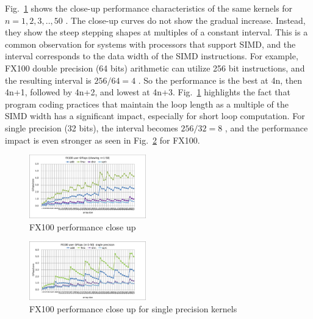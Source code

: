 \documentclass[conference]{IEEEtran}
\begin{document}
Fig.~\ref{fig:fx100-gflops-short-R8}
shows the close-up performance characteristics of the same kernels for
\begin{math}
n=1,2,3,..,50
\end{math}
.
The close-up curves do not show the gradual increase. Instead, they
show the steep stepping shapes at multiples of a constant interval.
This is a common observation for systems with processors that support SIMD,
and the interval corresponds to the data width of the SIMD instructions.
For example, FX100 double precision (64 bits) arithmetic can utilize
256 bit instructions, and the resulting interval is
\begin{math}
256 / 64 = 4
\end{math}
.
So the performance is the best at 4n, then 4n+1, followed by 4n+2,
and lowest at 4n+3.
Fig.~\ref{fig:fx100-gflops-short-R8} highlights the fact that
program coding practices that maintain the loop length as a multiple of
the SIMD width has a significant impact, especially for short loop computation.
For single precision (32 bits), the interval becomes
\begin{math}
256 / 32 = 8
\end{math}
, and the performance impact is even stronger as seen in
Fig.~\ref{fig:fx100-gflops-short-R4} for FX100.

\begin{figure}[tb]
\centering
\includegraphics[width=0.45\textwidth]{figs/fx100-gflops-short-R8.pdf}
\caption{FX100 performance close up}
\label{fig:fx100-gflops-short-R8}
\end{figure}

\begin{figure}[tb]
\centering
\includegraphics[width=0.45\textwidth]{figs/fx100-gflops-short-R4.pdf}
\caption{FX100 performance close up for single precision kernels}
\label{fig:fx100-gflops-short-R4}
\end{figure}
\end{document}

